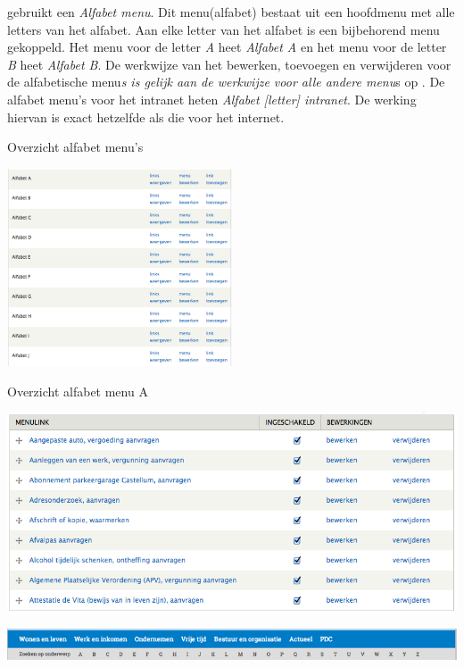 \drupalpath gebruikt een \emph{Alfabet menu}. Dit menu(alfabet) bestaat uit een hoofdmenu met alle letters van het alfabet. Aan elke letter van het alfabet is een bijbehorend menu gekoppeld. Het menu voor de letter \emph{A} heet \emph{Alfabet A} en het menu voor de letter \emph{B} heet \emph{Alfabet B}. De werkwijze van het bewerken, toevoegen en verwijderen voor de alfabetische menu\emph{s is gelijk aan de werkwijze voor alle andere menu}s op \drupalpath{}. De alfabet menu's voor het intranet heten \emph{Alfabet [letter] intranet}. De werking hiervan is exact hetzelfde als die voor het internet.

\bigskip

Overzicht alfabet menu's

\begin{center}
\includegraphics[width=0.5\textwidth]{img/menus_alfabet.png}
\end{center}

Overzicht alfabet menu A

\begin{center}
\includegraphics[width=\textwidth]{img/menu_alfabet_a.png}
\end{center}

\begin{center}
\includegraphics[width=\textwidth]{img/menu3.png}
\end{center}

